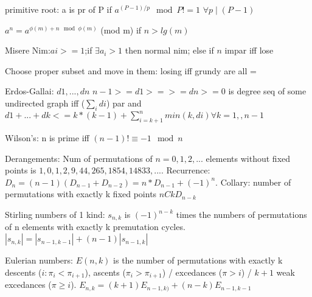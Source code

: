 primitive root: a is pr of P if $a^{(P-1)/p} \mod P!=1$ $\forall p \mid (P-1)$

$a^n = a^{\phi(m)+n \mod \phi(m)}$ (mod m) if $n > lg(m)$

Misere Nim:$ai>=1$;if $\exists a_i > 1$ then normal nim; else if $n$ impar iff lose

Choose proper subset and move in them: losing iff grundy are all =

Erdos-Gallai: ${d1,...,dn}$ $n-1>=d1>= >=dn>=0$ is degree seq of some
undirected graph iff ($\sum_i di$) par and $d1+ ... +dk<=k*(k-1)+\sum_{i=k+1}^{n} min(k,di) \forall k=1, ,n-1$

Wilson's: n is prime iff $(n-1)! \equiv -1 \mod n$

Derangements: Num of permutations of $n=0,1,2,...$ elements without fixed points is
$1,0,1,2,9,44,265,1854,14833,...$. Recurrence: $D_n = (n-1)(D_{n-1}+D_{n-2}) = n*D_{n-1}+(-1)^n$.
Collary: number of permutations with exactly k fixed points $nCk D_{n-k}$

Stirling numbers of 1 kind: $s_{n,k}$ is $(-1)^{n-k}$ times the numbers of permutations of n elements
with exactly k premutation cycles. $|s_{n,k}|=|s_{n-1,k-1}|+(n-1)|s_{n-1,k}|$

Eulerian numbers: $E(n,k)$ is the number of permutations with exactly k descents ($i:\pi_{i} < \pi_{i+1}$),
ascents ($\pi_i > \pi_{i+1}$) / excedances ($\pi > i$) / $k+1$ weak excedances ($\pi \geq i$).
$E_{n,k} = (k+1)E_{n-1,k)} + (n-k)E_{n-1,k-1}$
